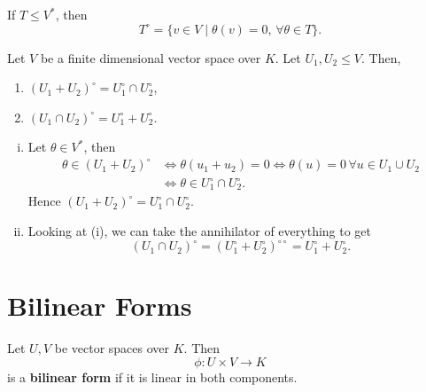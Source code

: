\documentclass[12pt]{article}
\begin{document}
\begin{remark}
	If $T \leq V^{\ast}$, then
	\[
		T^{\circ} = \{v \in V \mid \theta(v) = 0, \, \forall \theta \in T\}
	.\]
\end{remark}

\begin{lemma}
	Let $V$ be a finite dimensional vector space over $K$. Let $U_1, U_2 \leq V$. Then,
	\begin{enumerate}[\normalfont(i)]
		\item $(U_1 + U_2)^{\circ} = U_1^{\circ} \cap U_2^{\circ}$,
		\item $(U_1 \cap U_2)^{\circ} = U_1^{\circ} + U_2^{\circ}$.
	\end{enumerate}
\end{lemma}

\begin{proofbox}
\begin{enumerate}[(i)]
	\item Let $\theta \in V^{\ast}$, then
		\begin{align*}
			\theta \in (U_1 + U_2)^{\circ} &\iff \theta(u_1 + u_2) = 0 \iff \theta(u) = 0 \, \forall u \in U_1 \cup U_2 \\
						       &\iff \theta \in U_1^{\circ} \cap U_2^{\circ}.
		\end{align*}
		Hence $(U_1 + U_2)^{\circ} = U_1^{\circ} \cap U_2^{\circ}$.
	\item Looking at (i), we can take the annihilator of everything to get
		\[
			(U_1 \cap U_2)^{\circ} = (U_1^{\circ} + U_2^{\circ})^{\circ \circ} = U_1^{\circ} + U_2^{\circ}
		.\]
\end{enumerate}
\end{proofbox}

\newpage

\section{Bilinear Forms}%
\label{sec:bilinear_forms}

\begin{definition}
	Let $U, V$ be vector spaces over $K$. Then
	\[
	\phi : U \times V \to K
	\]
	is a \textbf{bilinear form} if it is linear in both components.
\end{definition}
\end{document}
